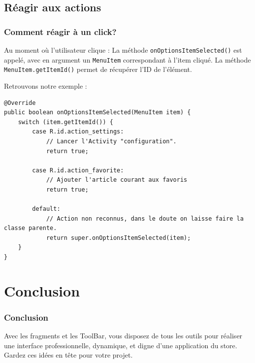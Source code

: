 \documentclass{beamer}
\begin{document}
\subsection{Réagir aux actions}

\begin{frame}
\frametitle{Comment réagir à un click?}
\begin{block}{Au moment où l'utilisateur clique :}
La méthode \verb!onOptionsItemSelected()! est appelé, avec en argument un \verb!MenuItem! correspondant à l'item cliqué. La méthode \verb!MenuItem.getItemId()! permet de récupérer l'ID de l'élément.
\end{block}
\end{frame}

\begin{frame}[fragile]
\begin{block}{Retrouvons notre exemple :}
\lstset{language=java}
\begin{lstlisting}
@Override
public boolean onOptionsItemSelected(MenuItem item) {
    switch (item.getItemId()) {
        case R.id.action_settings:
            // Lancer l'Activity "configuration".
            return true;

        case R.id.action_favorite:
            // Ajouter l'article courant aux favoris
            return true;

        default:
            // Action non reconnus, dans le doute on laisse faire la classe parente.
            return super.onOptionsItemSelected(item);
    }
}
\end{lstlisting}
\end{block}

\end{frame}

\section{Conclusion}

\begin{frame}
\frametitle{Conclusion}
\begin{block}{Avec les fragments et les ToolBar,}
vous disposez de tous les outils pour réaliser une interface professionnelle, dynamique, et digne d'une application du store. Gardez ces idées en tête pour votre projet.
\end{block}
\end{frame}
\end{document}
